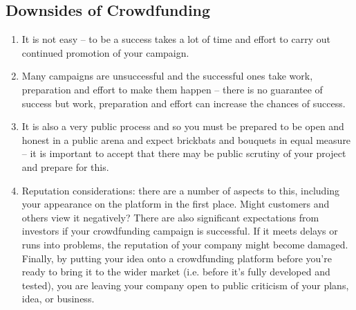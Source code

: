 \subsection*{ Downsides of Crowdfunding}
\begin{enumerate}
    \item It is not easy – to be a success takes a lot of time and effort to carry out continued
          promotion of your campaign.
    \item Many campaigns are unsuccessful and the successful ones take work, preparation
          and effort to make them happen – there is no guarantee of success but work,
          preparation and effort can increase the chances of success.
    \item It is also a very public process and so you must be prepared to be open and honest in
          a public arena and expect brickbats and bouquets in equal measure – it is important
          to accept that there may be public scrutiny of your project and prepare for this.
    \item Reputation considerations:
          there are a number of aspects to this, including your appearance on the platform in the first place. Might customers and others view it negatively? There are also significant expectations from investors if your crowdfunding campaign is successful. If it meets delays or runs into problems, the reputation of your company might become damaged. Finally, by putting your idea onto a crowdfunding platform before you’re ready to bring it to the wider market (i.e. before it’s fully developed and tested), you are leaving your company open to public criticism of your plans, idea, or business.
\end{enumerate}


